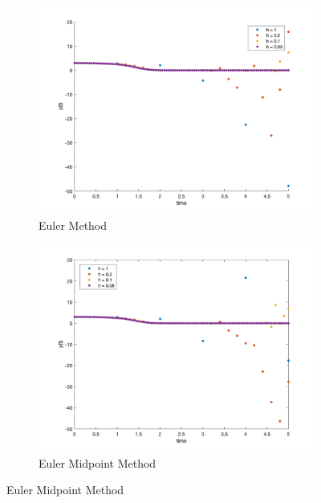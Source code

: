 \documentclass[12pt]{article}
\begin{document}
\begin{figure}[htp]
\centering

\begin{subfigure}{0.49\columnwidth}
\centering
\includegraphics[width=\textwidth]{euler_t_5.png}
\caption{Euler Method}
\label{fig:time1}
\end{subfigure}\hfill
\begin{subfigure}{0.49\columnwidth}
\centering
\includegraphics[width=\textwidth]{euler_mid_t_5.png}
\caption{Euler Midpoint Method}
\label{fig:time2}
\end{subfigure}

\medskip


\end{figure}
\end{document}
